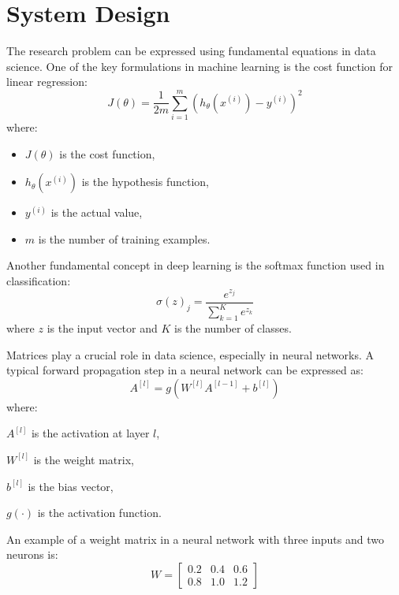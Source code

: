 
\chapter{System Design}
The research problem can be expressed using fundamental equations in data science. One of the key formulations in machine learning is the cost function for linear regression:
\begin{equation}
	J(\theta) = \frac{1}{2m} \sum_{i=1}^{m} \left( h_\theta (x^{(i)}) - y^{(i)} \right)^2
\end{equation}
where:
\begin{itemize}
	\item $J(\theta)$ is the cost function,
	\item $h_\theta(x^{(i)})$ is the hypothesis function,
	\item $y^{(i)}$ is the actual value,
	\item $m$ is the number of training examples.
\end{itemize}

Another fundamental concept in deep learning is the softmax function used in classification:
\begin{equation}
	\sigma(z)_j = \frac{e^{z_j}}{\sum_{k=1}^{K} e^{z_k}}
\end{equation}
where $z$ is the input vector and $K$ is the number of classes.

Matrices play a crucial role in data science, especially in neural networks. A typical forward propagation step in a neural network can be expressed as:
\begin{equation}
	A^{[l]} = g(W^{[l]} A^{[l-1]} + b^{[l]})
\end{equation}
where:
\begin{description}
	\item $A^{[l]}$ is the activation at layer $l$,
	\item $W^{[l]}$ is the weight matrix,
	\item $b^{[l]}$ is the bias vector,
	\item $g(\cdot)$ is the activation function.
\end{description}

An example of a weight matrix in a neural network with three inputs and two neurons is:
\begin{equation}
	W = \begin{bmatrix} 0.2 & 0.4 & 0.6 \\ 0.8 & 1.0 & 1.2 \end{bmatrix}
\end{equation}

